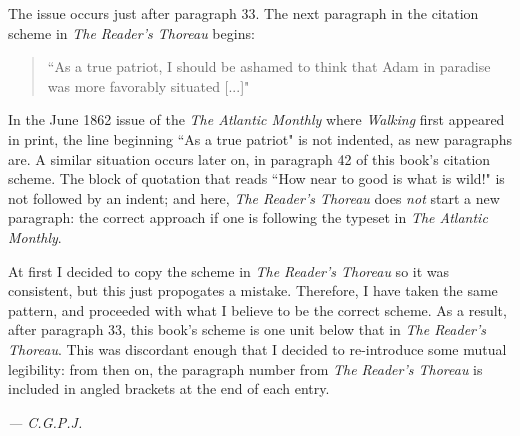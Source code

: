 \documentclass[twoside,openright,10pt]{memoir} %
\begin{document}
The issue occurs just after paragraph 33. The next paragraph in the citation scheme in \emph{The Reader's Thoreau} begins:\setlength\parskip{0pt}
\begin{quotation}
\noindent “As a true patriot, I should be ashamed to think that Adam in paradise was more favorably situated [...]"
\end{quotation}
In the June 1862 issue of the \emph{The Atlantic Monthly} where \emph{Walking} first appeared in print, the line beginning “As a true patriot" is not indented, as new paragraphs are. A similar situation occurs later on, in paragraph 42 of this book's citation scheme. The block of quotation that reads “How near to good is what is wild!" is not followed by an indent; and here, \emph{The Reader's Thoreau} does \emph{not} start a new paragraph: the correct approach if one is following the typeset in \emph{The Atlantic Monthly}.\setlength\parskip{10pt}

At first I decided to copy the scheme in \emph{The Reader's Thoreau} so it was consistent, but this just propogates a mistake. Therefore, I have taken the same pattern, and proceeded with what I believe to be the correct scheme. As a result, after paragraph 33, this book's scheme is one unit below that in \emph{The Reader's Thoreau}. This was discordant enough that I decided to re-introduce some mutual legibility: from then on, the paragraph number from \emph{The Reader's Thoreau} is included in angled brackets at the end of each entry.\setlength\parskip{0pt}
\begin{flushright}
  \emph{— C.\thinspace G.\thinspace P.\thinspace J.\thinspace }
\end{flushright}\setlength\parskip{10pt}
\end{document}
